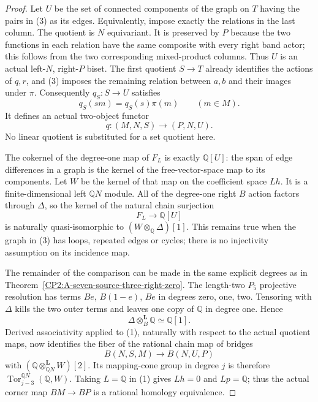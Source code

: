 \begin{proof}
Let $U$ be the set of connected components of the graph on
$T$ having the pairs in (3) as its edges.  Equivalently,
impose exactly the relations in the last column.  The
quotient is $N$ equivariant.  It is preserved by $P$ because
the two functions in each relation have the same composite
with every right band actor; this follows from the two
corresponding mixed-product columns.  Thus $U$ is an actual
left-$N$, right-$P$ biset.  The first quotient $S\to T$
already identifies the actions of $q,r$, and (3) imposes
the remaining relation between $a,b$ and their images
under $\pi$.  Consequently $q_S:S\to U$ satisfies
\[
 q_S(sm)=q_S(s)\pi(m)\qquad(m\in M).
\]
It defines an actual two-object functor
\[
 q:(M,N,S)\longrightarrow(P,N,U).                       \tag{4}
\]
No linear quotient is substituted for a set quotient here.

The cokernel of the degree-one map of $F_L$ is exactly
$\mathbb Q[U]$: the span of edge differences in a graph
is the kernel of the free-vector-space map to its components.
Let $W$ be the kernel of that map on the coefficient space
$Lh$.  It is a finite-dimensional left $\mathbb QN$ module.
All of the degree-one right $B$ action factors through
$\Delta$, so the kernel of the natural chain surjection
\[
 F_L\longrightarrow\mathbb Q[U]
\]
is naturally quasi-isomorphic to
$(W\otimes_{\mathbb Q}\Delta)[1]$.  This remains true
when the graph in (3) has loops, repeated edges or cycles;
there is no injectivity assumption on its incidence map.

The remainder of the comparison can be made in the same
explicit degrees as in
Theorem~\ref{CP2:A-seven-source-three-right-zero}.
The length-two $P_5$ projective resolution has terms
$Be$, $B(1-e)$, $Be$ in degrees zero, one, two.
Tensoring with $\Delta$ kills the two outer terms and
leaves one copy of $\mathbb Q$ in degree one.  Hence
\[
 \Delta\otimes_B^{\mathbf L}\mathbb Q\simeq\mathbb Q[1].
\]
Derived associativity applied to (1), naturally with respect
to the actual quotient maps, now identifies the fiber of
the rational chain map of bridges
\[
 B(N,S,M)\longrightarrow B(N,U,P)
\]
with $(\mathbb Q\otimes_{\mathbb QN}^{\mathbf L}W)[2]$.
Its mapping-cone group in degree $j$ is therefore
$\operatorname{Tor}^{\mathbb QN}_{j-3}(\mathbb Q,W)$.
Taking $L=\mathbb Q$ in (1) gives $Lh=0$ and $Lp=\mathbb Q$;
thus the actual corner map $BM\to BP$ is a rational
homology equivalence.


\end{proof}
